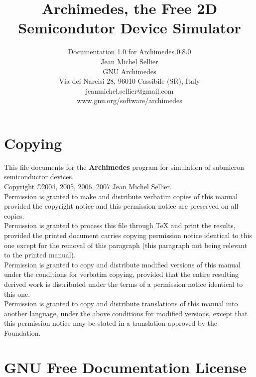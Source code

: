 \documentclass[12pt]{book}
\begin{document}
\title{\bf{Archimedes}, the Free 2D Semicondutor Device Simulator}

\author{Documentation 1.0 for Archimedes 0.8.0 \\ Jean Michel Sellier \\ GNU Archimedes \\ Via dei Narcisi 28, 96010 Cassibile (SR), Italy \\ jeanmichel.sellier@gmail.com \\  www.gnu.org/software/archimedes}

\maketitle


\dominitoc
\tableofcontents
\baselineskip=8mm
%
%



\chapter{Copying}

This file documents for the \textbf{Archimedes} program for simulation of  submicron semiconductor devices.
\\
Copyright \copyright 2004, 2005, 2006, 2007 Jean Michel Sellier.
\\
Permission is granted to make and distribute verbatim copies of
this manual provided the copyright notice and this permission notice
are preserved on all copies.
\\
Permission is granted to process this file through TeX and print the
results, provided the printed document carries copying permission
notice identical to this one except for the removal of this paragraph
(this paragraph not being relevant to the printed manual).
\\
Permission is granted to copy and distribute modified versions of this
manual under the conditions for verbatim copying, provided that the entire
resulting derived work is distributed under the terms of a permission
notice identical to this one.
\\
Permission is granted to copy and distribute translations of this manual
into another language, under the above conditions for modified versions,
except that this permission notice may be stated in a translation approved
by the Foundation.

\newpage

\chapter{GNU Free Documentation License}
\end{document}

